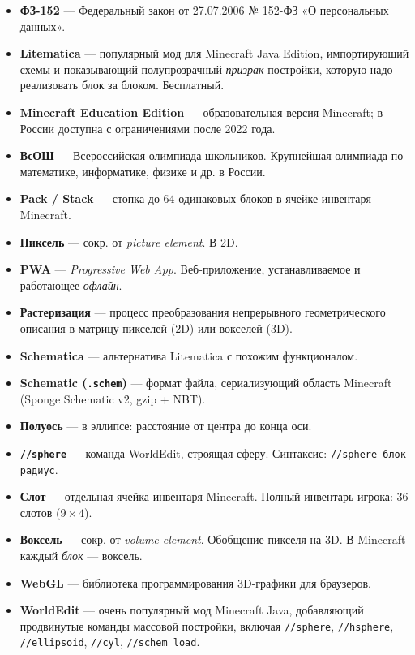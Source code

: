 \documentclass[12pt,a4paper]{scrartcl}
\newcommand{\code}[1]{\texttt{\small #1}}
\newcommand{\acc}[1]{\textcolor{accent}{\textbf{#1}}}
\newcommand{\cmd}[1]{\textcolor{earth}{\texttt{\small #1}}}
\begin{document}
\begin{itemize}[leftmargin=1.4em,itemsep=0.3em,topsep=0.3em]
  \item \acc{ФЗ-152} --- Федеральный закон от 27.07.2006 № 152-ФЗ «О персональных данных».
  \item \acc{Litematica} --- популярный мод для Minecraft Java Edition, импортирующий схемы и показывающий полупрозрачный \emph{призрак} постройки, которую надо реализовать блок за блоком. Бесплатный.
  \item \acc{Minecraft Education Edition} --- образовательная версия Minecraft; в России доступна с ограничениями после 2022 года.
  \item \acc{ВсОШ} --- Всероссийская олимпиада школьников. Крупнейшая олимпиада по математике, информатике, физике и др. в России.
  \item \acc{Pack / Stack} --- стопка до 64 одинаковых блоков в ячейке инвентаря Minecraft.
  \item \acc{Пиксель} --- сокр. от \emph{picture element}. В 2D.
  \item \acc{PWA} --- \emph{Progressive Web App}. Веб-приложение, устанавливаемое и работающее \emph{офлайн}.
  \item \acc{Растеризация} --- процесс преобразования непрерывного геометрического описания в матрицу пикселей (2D) или вокселей (3D).
  \item \acc{Schematica} --- альтернатива Litematica с похожим функционалом.
  \item \acc{Schematic (\texttt{.schem})} --- формат файла, сериализующий область Minecraft (Sponge Schematic v2, gzip + NBT).
  \item \acc{Полуось} --- в эллипсе: расстояние от центра до конца оси.
  \item \acc{\code{//sphere}} --- команда WorldEdit, строящая сферу. Синтаксис: \cmd{//sphere блок радиус}.
  \item \acc{Слот} --- отдельная ячейка инвентаря Minecraft. Полный инвентарь игрока: 36 слотов ($9 \times 4$).
  \item \acc{Воксель} --- сокр. от \emph{volume element}. Обобщение пикселя на 3D. В Minecraft каждый \emph{блок} --- воксель.
  \item \acc{WebGL} --- библиотека программирования 3D-графики для браузеров.
  \item \acc{WorldEdit} --- очень популярный мод Minecraft Java, добавляющий продвинутые команды массовой постройки, включая \cmd{//sphere}, \cmd{//hsphere}, \cmd{//ellipsoid}, \cmd{//cyl}, \cmd{//schem load}.
\end{itemize}
\end{document}
